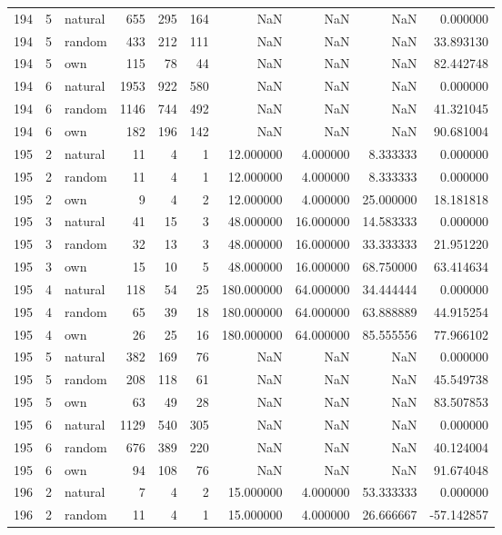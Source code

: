 \begin{table}[htbp]
\begin{tabular}{rrlrrrrrrr}
194 & 5 & natural & 655 & 295 & 164 & NaN & NaN & NaN & 0.000000 \\
194 & 5 & random & 433 & 212 & 111 & NaN & NaN & NaN & 33.893130 \\
194 & 5 & own & 115 & 78 & 44 & NaN & NaN & NaN & 82.442748 \\
194 & 6 & natural & 1953 & 922 & 580 & NaN & NaN & NaN & 0.000000 \\
194 & 6 & random & 1146 & 744 & 492 & NaN & NaN & NaN & 41.321045 \\
194 & 6 & own & 182 & 196 & 142 & NaN & NaN & NaN & 90.681004 \\
195 & 2 & natural & 11 & 4 & 1 & 12.000000 & 4.000000 & 8.333333 & 0.000000 \\
195 & 2 & random & 11 & 4 & 1 & 12.000000 & 4.000000 & 8.333333 & 0.000000 \\
195 & 2 & own & 9 & 4 & 2 & 12.000000 & 4.000000 & 25.000000 & 18.181818 \\
195 & 3 & natural & 41 & 15 & 3 & 48.000000 & 16.000000 & 14.583333 & 0.000000 \\
195 & 3 & random & 32 & 13 & 3 & 48.000000 & 16.000000 & 33.333333 & 21.951220 \\
195 & 3 & own & 15 & 10 & 5 & 48.000000 & 16.000000 & 68.750000 & 63.414634 \\
195 & 4 & natural & 118 & 54 & 25 & 180.000000 & 64.000000 & 34.444444 & 0.000000 \\
195 & 4 & random & 65 & 39 & 18 & 180.000000 & 64.000000 & 63.888889 & 44.915254 \\
195 & 4 & own & 26 & 25 & 16 & 180.000000 & 64.000000 & 85.555556 & 77.966102 \\
195 & 5 & natural & 382 & 169 & 76 & NaN & NaN & NaN & 0.000000 \\
195 & 5 & random & 208 & 118 & 61 & NaN & NaN & NaN & 45.549738 \\
195 & 5 & own & 63 & 49 & 28 & NaN & NaN & NaN & 83.507853 \\
195 & 6 & natural & 1129 & 540 & 305 & NaN & NaN & NaN & 0.000000 \\
195 & 6 & random & 676 & 389 & 220 & NaN & NaN & NaN & 40.124004 \\
195 & 6 & own & 94 & 108 & 76 & NaN & NaN & NaN & 91.674048 \\
196 & 2 & natural & 7 & 4 & 2 & 15.000000 & 4.000000 & 53.333333 & 0.000000 \\
196 & 2 & random & 11 & 4 & 1 & 15.000000 & 4.000000 & 26.666667 & -57.142857 \\

\end{tabular}
\end{table}
